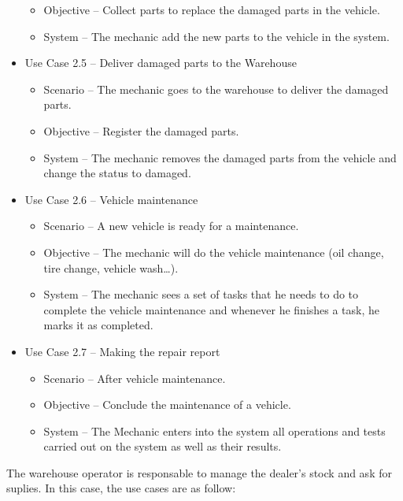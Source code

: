 \begin{itemize}
\begin{itemize}
      \item Objective – Collect parts to replace the damaged parts in the vehicle.
      \item System – The mechanic add the new parts to the vehicle in the system.
    \end{itemize}
    \item Use Case 2.5 – Deliver damaged parts to the Warehouse
    \begin{itemize}
      \item Scenario – The mechanic goes to the warehouse to deliver the damaged parts.
      \item Objective – Register the damaged parts.
      \item System – The mechanic removes the damaged parts from the vehicle and change the status to damaged.
    \end{itemize}
\item Use Case 2.6 – Vehicle maintenance
\begin{itemize}
  \item Scenario – A new vehicle is ready for a maintenance.
  \item Objective – The mechanic will do the vehicle maintenance (oil change, tire change, vehicle wash…).
  \item System – The mechanic sees a set of tasks that he needs to do to complete the vehicle maintenance and whenever he finishes a task, he marks it as completed.
\end{itemize}
\item Use Case 2.7 – Making the repair report
\begin{itemize}
  \item Scenario – After vehicle maintenance.
  \item Objective – Conclude the maintenance of a vehicle.
  \item System – The Mechanic enters into the system all operations and tests carried out on the system as well as their results.
\end{itemize}
\end{itemize}
\hfill \break

The warehouse operator is responsable to manage the dealer's stock and ask for suplies. 
In this case, the use cases are as follow:

